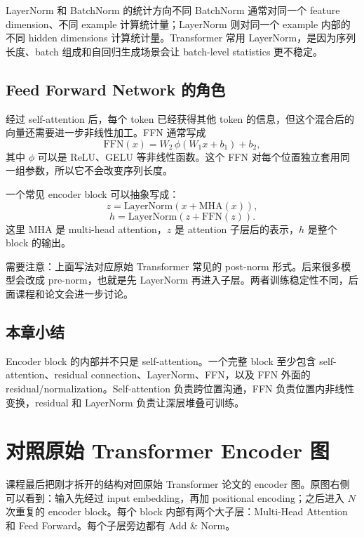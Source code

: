 \documentclass[a4paper]{article}
\begin{document}
\begin{warningbox}{LayerNorm 和 BatchNorm 的统计方向不同}
    BatchNorm 通常对同一个 feature dimension、不同 example 计算统计量；LayerNorm 则对同一个 example 内部的不同 hidden dimensions 计算统计量。Transformer 常用 LayerNorm，是因为序列长度、batch 组成和自回归生成场景会让 batch-level statistics 更不稳定。
\end{warningbox}

\subsection{Feed Forward Network 的角色}

经过 self-attention 后，每个 token 已经获得其他 token 的信息，但这个混合后的向量还需要进一步非线性加工。FFN 通常写成
\[
    \mathrm{FFN}(x)=W_2\,\phi(W_1x+b_1)+b_2,
\]
其中 $\phi$ 可以是 ReLU、GELU 等非线性函数。这个 FFN 对每个位置独立套用同一组参数，所以它不会改变序列长度。

一个常见 encoder block 可以抽象写成：
\[
    z = \mathrm{LayerNorm}(x + \mathrm{MHA}(x)),
\]
\[
    h = \mathrm{LayerNorm}(z + \mathrm{FFN}(z)).
\]
这里 $\mathrm{MHA}$ 是 multi-head attention，$z$ 是 attention 子层后的表示，$h$ 是整个 block 的输出。

需要注意：上面写法对应原始 Transformer 常见的 post-norm 形式。后来很多模型会改成 pre-norm，也就是先 LayerNorm 再进入子层。两者训练稳定性不同，后面课程和论文会进一步讨论。

\subsection{本章小结}

Encoder block 的内部并不只是 self-attention。一个完整 block 至少包含 self-attention、residual connection、LayerNorm、FFN，以及 FFN 外面的 residual/normalization。Self-attention 负责跨位置沟通，FFN 负责位置内非线性变换，residual 和 LayerNorm 负责让深层堆叠可训练。

\section{对照原始 Transformer Encoder 图}

课程最后把刚才拆开的结构对回原始 Transformer 论文的 encoder 图。原图右侧可以看到：输入先经过 input embedding，再加 positional encoding；之后进入 $N$ 次重复的 encoder block。每个 block 内部有两个大子层：Multi-Head Attention 和 Feed Forward。每个子层旁边都有 Add \& Norm。
\end{document}
